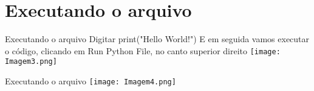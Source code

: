 \documentclass[fleqn,utf8,aspectratio=169,14pt]{beamer}
\begin{document}
	\section{Executando o arquivo}
	\begin{frame}{Executando o arquivo}
		Digitar print("Hello World!")
		E em seguida vamos executar o código, clicando em Run Python File, no canto superior direito
		\centering %
		\texttt{[image: Imagem3.png]}
	\end{frame}
	
	
	\begin{frame}{Executando o arquivo}
		\centering %
		\texttt{[image: Imagem4.png]}
	\end{frame}
	
\end{document}
